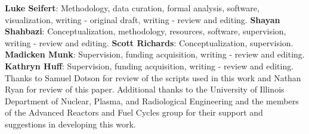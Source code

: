 \documentclass{style/nseJournal}
\begin{document}
\textbf{Luke Seifert}: Methodology, data curation, formal analysis, software, visualization, writing - original draft, writing - review and editing.
\textbf{Shayan Shahbazi}: Conceptualization, methodology, resources, software, supervision, writing - review and editing.
\textbf{Scott Richards}: Conceptualization, supervision.
\textbf{Madicken Munk}: Supervision, funding acquisition, writing - review and editing.
\textbf{Kathryn Huff}: Supervision, funding acquisition, writing - review and editing.
Thanks to Samuel Dotson for review of the scripts used in this work and Nathan Ryan for review of this paper.
Additional thanks to the University of Illinois Department of Nuclear, Plasma, and Radiological Engineering and the members of the Advanced Reactors and Fuel Cycles group for their support and suggestions in developing this work.


\pagebreak

\end{document}
